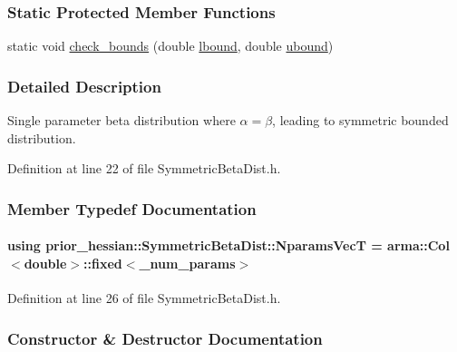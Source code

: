\subsubsection*{Static Protected Member Functions}
\begin{DoxyCompactItemize}
\item 
static void \hyperlink{classprior__hessian_1_1UnivariateDist_aec85554be4019eb2c5d92203a4e6d9f8}{check\+\_\+bounds} (double \hyperlink{classprior__hessian_1_1SymmetricBetaDist_a744ee31960d652c397f1b9ac1df4f1e6}{lbound}, double \hyperlink{classprior__hessian_1_1SymmetricBetaDist_ad1766580dc336913711d6e1ed94a7f7a}{ubound})
\end{DoxyCompactItemize}


\subsubsection{Detailed Description}
Single parameter beta distribution where $\alpha = \beta$, leading to symmetric bounded distribution. 



Definition at line 22 of file Symmetric\+Beta\+Dist.\+h.



\subsubsection{Member Typedef Documentation}
\paragraph[{\texorpdfstring{Nparams\+VecT}{NparamsVecT}}]{\setlength{\rightskip}{0pt plus 5cm}using {\bf prior\+\_\+hessian\+::\+Symmetric\+Beta\+Dist\+::\+Nparams\+VecT} =  arma\+::\+Col$<$double$>$\+::fixed$<$\+\_\+num\+\_\+params$>$}\hypertarget{classprior__hessian_1_1SymmetricBetaDist_a62959cfb48b557fde35822b1c0d9a48d}{}\label{classprior__hessian_1_1SymmetricBetaDist_a62959cfb48b557fde35822b1c0d9a48d}


Definition at line 26 of file Symmetric\+Beta\+Dist.\+h.



\subsubsection{Constructor \& Destructor Documentation}
